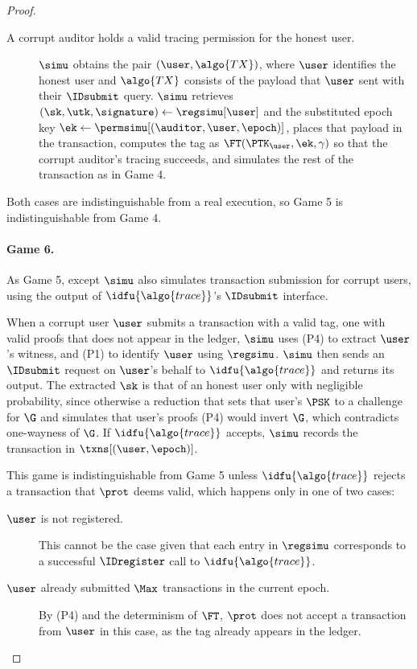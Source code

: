 \begin{proof}
\begin{description}
    \item[A corrupt auditor holds a valid tracing permission for the honest
user.] $\simu$ obtains the pair $(\user, \algo{TX})$, where $\user$ identifies
the honest user and $\algo{TX}$ consists of the payload that $\user$ sent with
their $\IDsubmit$ query. $\simu$ retrieves $(\sk, \utk,\signature) \leftarrow
\regsimu[\user]$ and the substituted epoch key $\ek \leftarrow
\permsimu[(\auditor,\user,\epoch)]$, places that payload in the transaction,
computes the tag as $\FT(\PTK_\user,\ek,\gamma)$ so that the corrupt auditor's
tracing succeeds, and simulates the rest of the transaction as in
Game 4.

  \end{description}

  Both cases are indistinguishable from a real execution, so Game 5 is
indistinguishable from Game 4.

  \paragraph{Game 6.} As Game 5, except $\simu$ also simulates transaction
submission for corrupt users, using the output of $\idfu{\algo{trace}}$'s
$\IDsubmit$ interface.

  When a corrupt user $\user$ submits a transaction with a valid tag, one with
valid proofs that does not appear in the ledger, $\simu$ uses (P4) to extract
$\user$'s witness, and (P1) to identify $\user$ using $\regsimu$.  $\simu$ then
sends an $\IDsubmit$ request on $\user$'s behalf to $\idfu{\algo{trace}}$ and
returns its output. The extracted $\sk$ is that of an honest user only with
negligible probability, since otherwise a reduction that sets that user's $\PSK$ to a
challenge for $\G$ and simulates that user's proofs (P4) would invert $\G$,
which contradicts one-wayness of $\G$. If $\idfu{\algo{trace}}$ accepts, $\simu$ records the
transaction in $\txns[(\user,\epoch)]$.

  This game is indistinguishable from Game 5 unless $\idfu{\algo{trace}}$
rejects a transaction that $\prot$ deems valid, which happens only in one of two
cases:

  \begin{description}

    \item[$\user$ is not registered.] This cannot be the case given that each
entry in $\regsimu$ corresponds to a successful $\IDregister$ call to
$\idfu{\algo{trace}}$.

    \item[$\user$ already submitted $\Max$ transactions in the current epoch.]
By (P4) and the determinism of $\FT$, $\prot$ does not accept a transaction from
$\user$ in this case, as the tag already appears in the ledger.


\end{description}
\end{proof}
